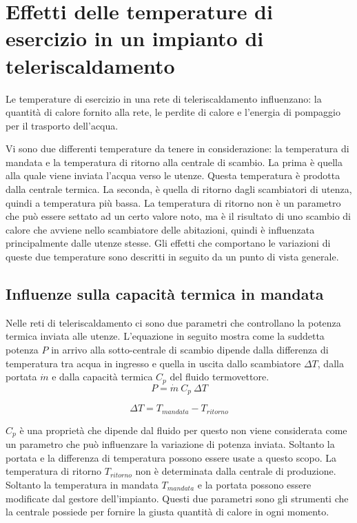 \documentclass[laurea,oneside,11pt]{USiena_tesiLM}
\begin{document}
\section{Effetti delle temperature di esercizio in un impianto di teleriscaldamento}
Le temperature di esercizio in una rete di teleriscaldamento  influenzano: la quantità di calore fornito alla rete, le perdite di calore e l'energia di pompaggio per il trasporto dell'acqua.

Vi sono due differenti temperature da tenere in considerazione: la temperatura di mandata e la temperatura di ritorno alla centrale di scambio. La prima è quella alla quale viene inviata l'acqua verso le utenze. Questa temperatura è prodotta dalla centrale termica. La seconda, è quella di ritorno dagli scambiatori di utenza, quindi a temperatura più bassa. La temperatura di ritorno non è un parametro che può essere settato ad un certo valore noto, ma è il risultato di uno scambio di calore che avviene nello scambiatore delle abitazioni, quindi è influenzata principalmente dalle utenze stesse.
Gli effetti che comportano le variazioni di queste due temperature sono descritti in seguito da un punto di vista generale. 

\subsection{Influenze sulla capacità termica in mandata}
Nelle reti di teleriscaldamento ci sono due parametri che controllano la potenza termica inviata alle utenze. L'equazione in seguito mostra come la suddetta potenza $P$ in arrivo alla sotto-centrale di scambio dipende dalla differenza di temperatura tra acqua in ingresso e quella in uscita dallo scambiatore $\Delta T$, dalla portata $\dot{m}$ e dalla capacità termica $C_p$ del fluido termovettore.
\begin{equation}
P = \dot{m} \ C_p \ \Delta T 
\label{eq:Potenza}
\end{equation} 

\begin{equation}
\Delta T = T_{mandata} - T_{ritorno}
\label{eq:dT}
\end{equation}

$C_p$ è una proprietà che dipende dal fluido per questo non viene considerata come un parametro che può influenzare la variazione di potenza inviata. Soltanto la portata e la differenza di temperatura   possono essere usate a questo scopo. La temperatura di ritorno $T_{ritorno}$ non è determinata dalla centrale di produzione. Soltanto la temperatura in mandata $T_{mandata}$ e la portata possono essere modificate dal gestore dell'impianto.
Questi due parametri sono gli strumenti che la centrale possiede per fornire la giusta quantità di calore in ogni momento.
\end{document}
